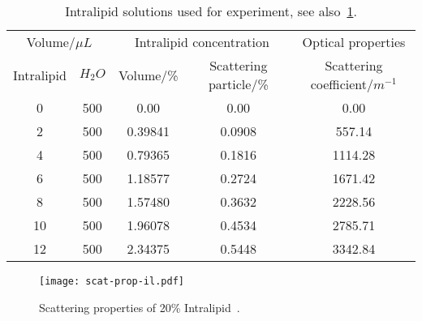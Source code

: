 \begin{table}[!ht]
    \begin{tabular}{cc|cc|c}
        \hline
        \multicolumn{2}{c|}{Volume/$\mu L$} & \multicolumn{2}{c|}{Intralipid concentration}                       & Optical properties              \\
        Intralipid                & $H_2O$  & Volume/\%      & Scattering particle/\%                             & Scattering coefficient/$m^{-1}$ \\ \hline
        \multicolumn{1}{c|}{0}    & 500     & \multicolumn{1}{c|}{0.00}    & 0.00                                 & 0.00                            \\
        \multicolumn{1}{c|}{2}    & 500     & \multicolumn{1}{c|}{0.39841} & 0.0908                               & 557.14                          \\
        \multicolumn{1}{c|}{4}    & 500     & \multicolumn{1}{c|}{0.79365} & 0.1816                               & 1114.28                         \\
        \multicolumn{1}{c|}{6}    & 500     & \multicolumn{1}{c|}{1.18577} & 0.2724                               & 1671.42                         \\
        \multicolumn{1}{c|}{8}    & 500     & \multicolumn{1}{c|}{1.57480} & 0.3632                               & 2228.56                         \\
        \multicolumn{1}{c|}{10}   & 500     & \multicolumn{1}{c|}{1.96078} & 0.4534                               & 2785.71                         \\
        \multicolumn{1}{c|}{12}   & 500     & \multicolumn{1}{c|}{2.34375} & 0.5448                               & 3342.84                         \\ \hline
    \end{tabular}
    \caption{Intralipid solutions used for experiment, see also~\cref{fig:ilscatprop}.}
    \label{tab:intra}
\end{table}

\begin{figure}[!ht]
    \centering
    \texttt{[image: scat-prop-il.pdf]}
    \caption{Scattering properties of 20\% Intralipid~\cite{michels2008optical}.}
    \label{fig:ilscatprop}
    \vspace{-10pt}
\end{figure}

